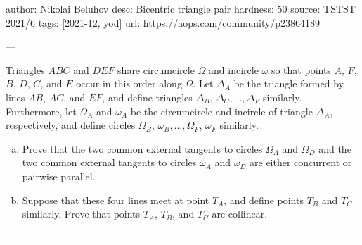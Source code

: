 author: Nikolai Beluhov
desc: Bicentric triangle pair
hardness: 50
source: TSTST 2021/6
tags: [2021-12, yod]
url: https://aops.com/community/p23864189

---

Triangles $ABC$ and $DEF$ share circumcircle $\Omega$ and incircle $\omega$
so that points $A$, $F$, $B$, $D$, $C$, and $E$ occur in this order along $\Omega$.
Let $\Delta_A$ be the triangle formed by lines $AB$, $AC$, and $EF$,
and define triangles $\Delta_B$, $\Delta_C, \dots, \Delta_F$ similarly.
Furthermore, let $\Omega_A$ and $\omega_A$ be the circumcircle and incircle
of triangle $\Delta_A$, respectively, and define circles
$\Omega_B$, $\omega_B, \dots, \Omega_F$, $\omega_F$ similarly.
\begin{enumerate}[(a)]
  \item Prove that the two common external tangents to circles $\Omega_A$ and $\Omega_D$
    and the two common external tangents to circles $\omega_A$ and $\omega_D$
    are either concurrent or pairwise parallel.

  \item Suppose that these four lines meet at point $T_A$,
    and define points $T_B$ and $T_C$ similarly.
    Prove that points $T_A$, $T_B$, and $T_C$ are collinear.
\end{enumerate}

---

